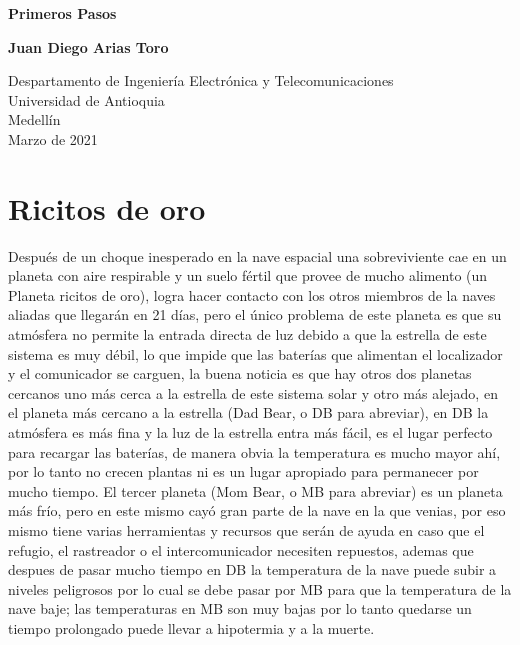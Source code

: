 \documentclass{article}
\begin{document}
\begin{titlepage}
    \begin{center}
        \vspace*{1cm}
            
        \Huge
        \textbf{Primeros Pasos}
            
        \vspace{0.5cm}
        \LARGE
        
            
        \vspace{1.5cm}
            
        \textbf{Juan Diego Arias Toro}
            
        \vfill
            
        \vspace{0.8cm}
            
        \Large
        Despartamento de Ingeniería Electrónica y Telecomunicaciones\\
        Universidad de Antioquia\\
        Medellín\\
        Marzo de 2021
            
    \end{center}
\end{titlepage}

\tableofcontents
\newpage
\section{Ricitos de oro}\label{intro}
Después de un choque inesperado en la nave espacial una sobreviviente cae en un planeta con aire respirable y un suelo fértil que provee de mucho alimento (un Planeta ricitos de oro), logra hacer contacto con los otros miembros de la naves aliadas que llegarán en 21 días, pero el único problema de este planeta es que su atmósfera no permite la entrada directa de luz debido a que la estrella de este sistema es muy débil, lo que impide que las baterías que alimentan el localizador y el comunicador se carguen, la buena noticia es que hay otros dos planetas cercanos uno más cerca a la estrella de este sistema solar y otro más alejado, en el planeta más cercano a la estrella (Dad Bear, o DB para abreviar), en DB la atmósfera es más fina y la luz de la estrella entra más fácil, es el lugar perfecto para recargar las baterías, de manera obvia la temperatura es mucho mayor ahí, por lo tanto no crecen plantas ni es un lugar apropiado para permanecer por mucho tiempo. El tercer planeta (Mom Bear, o MB para abreviar) es un planeta más frío, pero en este mismo cayó gran parte de la nave en la que venias, por eso mismo tiene varias herramientas y recursos que serán de ayuda en caso que el refugio, el rastreador o el intercomunicador necesiten repuestos, ademas que despues de pasar mucho tiempo en DB la temperatura de la nave puede subir a niveles peligrosos por lo cual se debe pasar por MB para que la temperatura de la nave baje; las temperaturas en MB son muy bajas por lo tanto quedarse un tiempo prolongado puede llevar a hipotermia y a la muerte.
\end{document}
